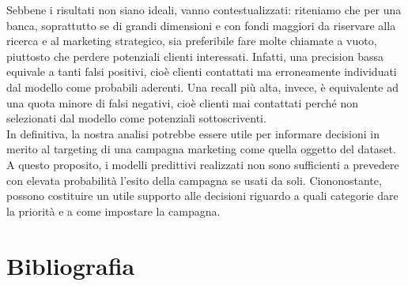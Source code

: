 \documentclass[11,5pt, a4paper]{article}
\begin{document}
Sebbene i risultati non siano ideali, vanno contestualizzati: riteniamo che per una banca, soprattutto se di grandi dimensioni e con fondi maggiori da riservare alla ricerca e al marketing strategico, sia preferibile fare molte chiamate a vuoto, piuttosto che perdere potenziali clienti interessati. Infatti, una precision bassa equivale a tanti falsi positivi, cioè clienti contattati ma erroneamente individuati dal modello come probabili aderenti. Una recall più alta, invece, è equivalente ad una quota minore di falsi negativi, cioè clienti mai contattati perché non selezionati dal modello come potenziali sottoscriventi. \\


In definitiva, la nostra analisi potrebbe essere utile per informare decisioni in merito al targeting di una campagna marketing come quella oggetto del dataset. A questo proposito, i modelli predittivi realizzati non sono sufficienti a prevedere con elevata probabilità l'esito della campagna se usati da soli. Ciononostante, possono costituire un utile supporto alle decisioni riguardo a quali categorie dare la priorità e a come impostare la campagna.


\section{Bibliografia}


\end{document}
